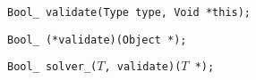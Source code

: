 
\tt{Bool_ validate(Type type, Void *this);}


\tt{Bool_ (*validate)(Object *);}


\tt{Bool_ solver_(}$T$\tt{, validate)(}$T$ \tt{*);}
